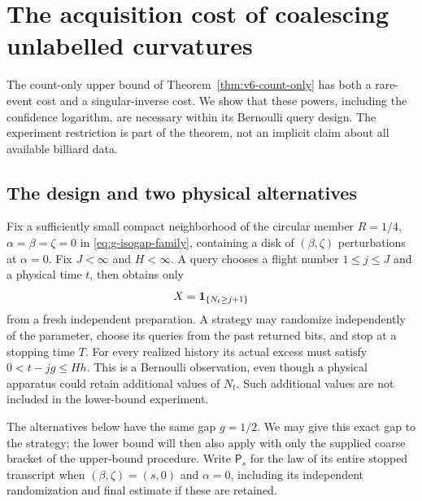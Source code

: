 \section{The acquisition cost of coalescing unlabelled curvatures}
\label{sec:v7-count-lower}
The count-only upper bound of Theorem~\ref{thm:v6-count-only} has both a rare-event cost and a singular-inverse cost. We show that these powers, including the confidence logarithm, are necessary within its Bernoulli query design. The experiment restriction is part of the theorem, not an implicit claim about all available billiard data.

\subsection{The design and two physical alternatives}
Fix a sufficiently small compact neighborhood of the circular member $R=1/4$, $\alpha=\beta=\zeta=0$ in \eqref{eq:g-isogap-family}, containing a disk of $(\beta,\zeta)$ perturbations at $\alpha=0$. Fix $J<\infty$ and $H<\infty$. A query chooses a flight number $1\le j\le J$ and a physical time $t$, then obtains only
\[
                         X=\mathbf1_{\{N_t\ge j+1\}}
\]
from a fresh independent preparation. A strategy may randomize independently of the parameter, choose its queries from the past returned bits, and stop at a stopping time $T$. For every realized history its actual excess must satisfy $0<t-jg\le Hh$. This is a Bernoulli observation, even though a physical apparatus could retain additional values of $N_t$. Such additional values are not included in the lower-bound experiment.

The alternatives below have the same gap $g=1/2$. We may give this exact gap to the strategy; the lower bound will then also apply with only the supplied coarse bracket of the upper-bound procedure. Write $\mathsf P_s$ for the law of its entire stopped transcript when $(\beta,\zeta)=(s,0)$ and $\alpha=0$, including its independent randomization and final estimate if these are retained.

